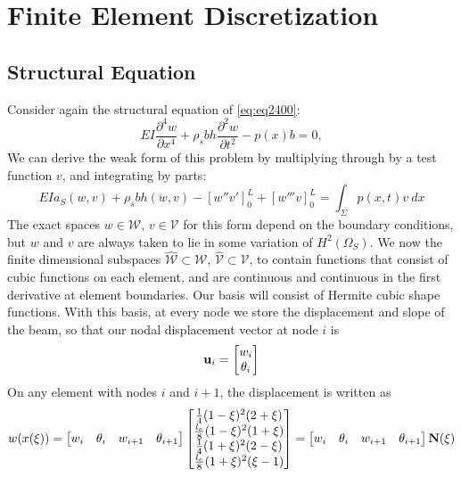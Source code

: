 \documentclass{article}
\begin{document}
\section{Finite Element Discretization}
\subsection{Structural Equation}
Consider again the structural equation of \ref{eq:eq2400}:
\[ EI\frac{\partial^4 w}{\partial x^4}+\rho_s b h \frac{\partial ^2 w}{\partial t^2}-p(x)b=0, \]
We can derive the weak form of this problem by multiplying through by a test function $v$, and integrating by parts:
\begin{equation} EI a_S(w,v) + \rho_s b h( \ddot{w},v ) - \left[w'' v' \right]_0^L + \left[w''' v \right]_0^L =  \int_{\Sigma }p(x,t)v \ dx \label{eq:eq4800} \end{equation}
The exact spaces $w \in \mathcal{W}$, $v \in \mathcal{V}$ for this form depend on the boundary conditions, but $w$ and $v$ are always taken to lie in some variation of $H^2(\Omega_S)$.
We now the finite dimensional subspaces $\widehat{\mathcal{W}} \subset \mathcal{W}$, $\widehat{\mathcal{V}} \subset \mathcal{V}$, to contain functions that consist of cubic functions on each element, and are continuous and continuous in the first derivative at element boundaries.
Our basis will consist of Hermite cubic shape functions.
With this basis, at every node we store the displacement and slope of the beam, so that our nodal displacement vector at node $i$ is
\[ {\bf u}_i = \begin{bmatrix} w_i \\ \theta_i \end{bmatrix} \]
On any element with nodes $i$ and $i+1$, the displacement is written as
\begin{equation} w(x(\xi)) = \begin{bmatrix} 
w_i & \theta_i & w_{i+1} & \theta_{i+1} 
\end{bmatrix} \begin{bmatrix}
\frac{1}{4}(1-\xi)^2(2+\xi) \\
\frac{l_e}{8}(1-\xi)^2(1+\xi) \\
\frac{1}{4}(1+\xi)^2(2-\xi) \\
\frac{l_e}{8}(1+\xi)^2(\xi-1)
\end{bmatrix} =  \begin{bmatrix} 
w_i & \theta_i & w_{i+1} & \theta_{i+1} 
\end{bmatrix} {\bf N(\xi) } \label{eq:eq4900} \end{equation}
\end{document}
